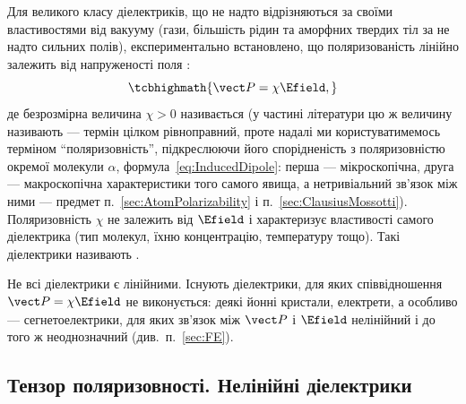 Для великого класу діелектриків, що не надто відрізняються за своїми властивостями від вакууму (гази, більшість рідин та аморфних твердих тіл за не
надто сильних полів), експериментально встановлено, що поляризованість лінійно залежить від напруженості поля :
\begin{equation}\label{eq:PlinearE}
	\tcbhighmath{
		\vect P = \chi \Efield,
	}
\end{equation}
де безрозмірна величина $\chi > 0$ називається  (у частині літератури цю ж величину називають  --- термін цілком рівноправний, проте надалі ми користуватимемось терміном \enquote{поляризовність}, підкреслюючи його спорідненість
з поляризовністю окремої молекули $\alpha$, формула~\eqref{eq:InducedDipole}: перша --- мікроскопічна, друга --- макроскопічна характеристики того
самого явища, а нетривіальний зв'язок між ними --- предмет п.~\ref{sec:AtomPolarizability} і п.~\ref{sec:ClausiusMossotti}). Поляризовність $\chi$
не залежить від $\Efield$ і характеризує властивості самого діелектрика (тип молекул, їхню концентрацію, температуру тощо). Такі діелектрики
називають .

\begin{Attention}
	Не всі діелектрики є лінійними. Існують діелектрики, для яких співвідношення $\vect P = \chi\Efield$ не виконується: деякі йонні кристали,
	електрети, а особливо --- сегнетоелектрики, для яких зв'язок між $\vect P$ і $\Efield$ нелінійний і до того ж неоднозначний (див.~п.~\ref{sec:FE}).
\end{Attention}

\subsection*{Тензор поляризовності. Нелінійні діелектрики}

